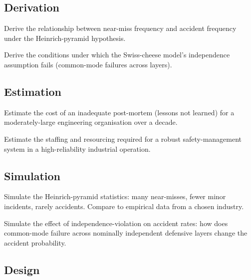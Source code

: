 \subsection*{Derivation}

\begin{exercise}
Derive the relationship between near-miss frequency and accident frequency under the Heinrich-pyramid hypothesis.
\end{exercise}

\begin{exercise}
Derive the conditions under which the Swiss-cheese model's independence assumption fails (common-mode failures across layers).
\end{exercise}

\subsection*{Estimation}

\begin{exercise}
Estimate the cost of an inadequate post-mortem (lessons not learned) for a moderately-large engineering organisation over a decade.
\end{exercise}

\begin{exercise}
Estimate the staffing and resourcing required for a robust safety-management system in a high-reliability industrial operation.
\end{exercise}

\subsection*{Simulation}

\begin{exercise}
Simulate the Heinrich-pyramid statistics: many near-misses, fewer minor incidents, rarely accidents. Compare to empirical data from a chosen industry.
\end{exercise}

\begin{exercise}
Simulate the effect of independence-violation on accident rates: how does common-mode failure across nominally independent defensive layers change the accident probability.
\end{exercise}

\subsection*{Design}

